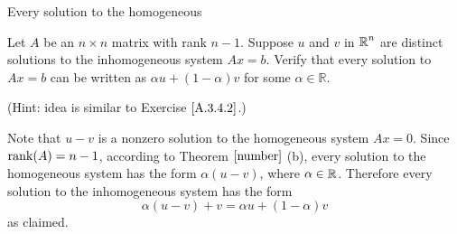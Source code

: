 \documentclass{ximera}
\begin{document}
\begin{exercise} \label{YZ_3.4.5}
Every solution to the homogeneous

Let $A$ be an $n\times n$ matrix with rank $n-1$.  Suppose $u$ and $v$ in $\mbox{$\mathbb{R}$}^n$ are distinct solutions to the inhomogeneous system $Ax = b$.  Verify that every solution to $Ax = b$ can be written as 
$\alpha u+(1-\alpha)v$ for some $\alpha\in \mathbb R$.

(Hint: idea is similar to Exercise $\ref{A.3.4.2}$.)

\begin{solution}
\soln 

Note that $u-v$ is a nonzero solution to the homogeneous system $Ax = 0$.  Since ${\rm rank}(A) = n-1$, according to Theorem $\ref{number}$ (b), every solution to the homogeneous system has the form $\alpha(u-v)$, where $\alpha\in\mbox{$\mathbb{R}$}$.  Therefore every solution to the inhomogeneous system has the form
\[
\alpha(u-v) + v = \alpha u + (1-\alpha) v
\]
as claimed.

\end{solution}
\end{exercise}
\end{document}
